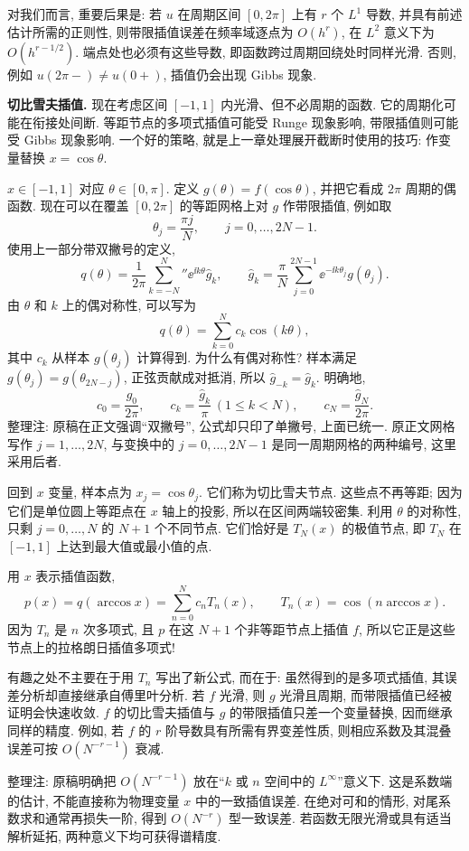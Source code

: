 对我们而言, 重要后果是: 若 $u$ 在周期区间 $[0,2\pi]$ 上有 $r$ 个 $L^1$ 导数, 并具有前述估计所需的正则性, 则带限插值误差在频率域逐点为 $O(h^r)$, 在 $L^2$ 意义下为 $O(h^{r-1/2})$. 端点处也必须有这些导数, 即函数跨过周期回绕处时同样光滑. 否则, 例如 $u(2\pi-)\ne u(0+)$, 插值仍会出现 Gibbs 现象.

\textbf{切比雪夫插值.} 现在考虑区间 $[-1,1]$ 内光滑、但不必周期的函数. 它的周期化可能在衔接处间断. 等距节点的多项式插值可能受 Runge 现象影响, 带限插值则可能受 Gibbs 现象影响. 一个好的策略, 就是上一章处理展开截断时使用的技巧: 作变量替换 $x=\cos\theta$.

$x\in[-1,1]$ 对应 $\theta\in[0,\pi]$. 定义 $g(\theta)=f(\cos\theta)$, 并把它看成 $2\pi$ 周期的偶函数. 现在可以在覆盖 $[0,2\pi]$ 的等距网格上对 $g$ 作带限插值, 例如取
\[
\theta_j=\frac{\pi j}N,\qquad j=0,\ldots,2N-1.
\]
使用上一部分带双撇号的定义,
\[
q(\theta)=\frac1{2\pi}\sum_{k=-N}^{N}{}''\ee^{\ii k\theta}\widehat g_k,
\qquad
\widehat g_k=\frac\pi N\sum_{j=0}^{2N-1}\ee^{-\ii k\theta_j}g(\theta_j).
\]
由 $\theta$ 和 $k$ 上的偶对称性, 可以写为
\[
q(\theta)=\sum_{k=0}^{N}c_k\cos(k\theta),
\]
其中 $c_k$ 从样本 $g(\theta_j)$ 计算得到. 为什么有偶对称性? 样本满足 $g(\theta_j)=g(\theta_{2N-j})$, 正弦贡献成对抵消, 所以 $\widehat g_{-k}=\widehat g_k$. 明确地,
\[
c_0=\frac{\widehat g_0}{2\pi},\qquad
c_k=\frac{\widehat g_k}{\pi}\ (1\le k<N),\qquad
c_N=\frac{\widehat g_N}{2\pi}.
\]
整理注: 原稿在正文强调“双撇号”, 公式却只印了单撇号, 上面已统一. 原正文网格写作 $j=1,\ldots,2N$, 与变换中的 $j=0,\ldots,2N-1$ 是同一周期网格的两种编号, 这里采用后者.

回到 $x$ 变量, 样本点为 $x_j=\cos\theta_j$. 它们称为切比雪夫节点. 这些点不再等距; 因为它们是单位圆上等距点在 $x$ 轴上的投影, 所以在区间两端较密集. 利用 $\theta$ 的对称性, 只剩 $j=0,\ldots,N$ 的 $N+1$ 个不同节点. 它们恰好是 $T_N(x)$ 的极值节点, 即 $T_N$ 在 $[-1,1]$ 上达到最大值或最小值的点.

用 $x$ 表示插值函数,
\[
p(x)=q(\arccos x)=\sum_{n=0}^{N}c_nT_n(x),
\qquad T_n(x)=\cos(n\arccos x).
\]
因为 $T_n$ 是 $n$ 次多项式, 且 $p$ 在这 $N+1$ 个非等距节点上插值 $f$, 所以它正是这些节点上的拉格朗日插值多项式!

有趣之处不主要在于用 $T_n$ 写出了新公式, 而在于: 虽然得到的是多项式插值, 其误差分析却直接继承自傅里叶分析. 若 $f$ 光滑, 则 $g$ 光滑且周期, 而带限插值已经被证明会快速收敛. $f$ 的切比雪夫插值与 $g$ 的带限插值只差一个变量替换, 因而继承同样的精度. 例如, 若 $f$ 的 $r$ 阶导数具有所需有界变差性质, 则相应系数及其混叠误差可按 $O(N^{-r-1})$ 衰减.
\begin{remark}
整理注: 原稿明确把 $O(N^{-r-1})$ 放在“$k$ 或 $n$ 空间中的 $L^\infty$”意义下. 这是系数端的估计, 不能直接称为物理变量 $x$ 中的一致插值误差. 在绝对可和的情形, 对尾系数求和通常再损失一阶, 得到 $O(N^{-r})$ 型一致误差. 若函数无限光滑或具有适当解析延拓, 两种意义下均可获得谱精度.
\end{remark}

